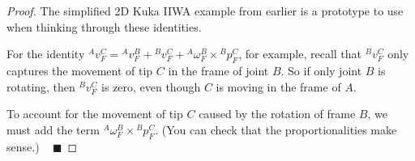 \begin{proof}
    The simplified 2D Kuka IIWA example from earlier
    is a prototype to use when
    thinking through these identities.

    For the identity ${}^Av^C_F = {}^Av^B_F + {}^Bv^C_F
    + {}^A\omega^B_F \times {}^Bp^C_F$, for example,
    recall that ${}^Bv^C_F$ only captures
    the movement of tip $C$ in the frame of joint $B$.
    So if only joint $B$ is rotating, then ${}^Bv^C_F$ is zero,
    even though $C$ is moving in the frame of $A$.

    To account for the movement of tip $C$ caused by
    the rotation of frame $B$, we must add the term
    ${}^A\omega^B_F \times {}^Bp^C_F$.
    (You can check that the proportionalities make sense.)
    ~ $\blacksquare$
\end{proof}

